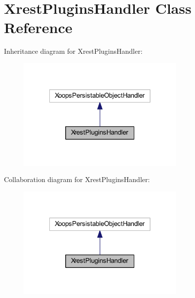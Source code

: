 \hypertarget{class_xrest_plugins_handler}{\section{Xrest\-Plugins\-Handler Class Reference}
\label{class_xrest_plugins_handler}
}


Inheritance diagram for Xrest\-Plugins\-Handler\-:
\nopagebreak
\begin{figure}[H]
\begin{center}
\leavevmode
\includegraphics[width=232pt]{class_xrest_plugins_handler__inherit__graph}
\end{center}
\end{figure}


Collaboration diagram for Xrest\-Plugins\-Handler\-:
\nopagebreak
\begin{figure}[H]
\begin{center}
\leavevmode
\includegraphics[width=232pt]{class_xrest_plugins_handler__coll__graph}
\end{center}
\end{figure}
